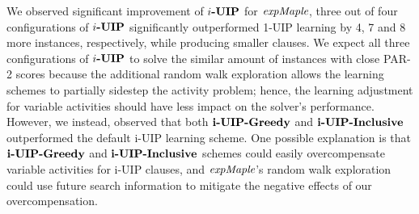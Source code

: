 \documentclass[runningheads]{llncs}
\begin{document}
We observed significant improvement of $\textbf{$i$-UIP}$ for $\textit{expMaple}$,
three out of four configurations of $\textbf{$i$-UIP}$ significantly outperformed
1-UIP learning by 4, 7 and 8 more instances, respectively, while
producing smaller clauses. We expect all three configurations of
$\textbf{$i$-UIP}$ to solve the similar amount of instances with close PAR-2
scores because the additional random walk exploration allows the
learning schemes to partially sidestep the activity problem; hence,
the learning adjustment for variable activities should have less
impact on the solver's performance. However, we instead, observed that
both $\textbf{i-UIP-Greedy}$ and $\textbf{i-UIP-Inclusive}$ outperformed the default i-UIP
learning scheme. One possible explanation is that $\textbf{i-UIP-Greedy}$ and
$\textbf{i-UIP-Inclusive}$ schemes could easily overcompensate variable activities
for i-UIP clauses, and $\textit{expMaple}$'s random walk exploration could
use future search information to mitigate the negative effects of our
overcompensation.

{}

\end{document}
